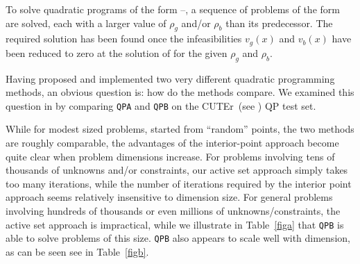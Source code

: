 \documentclass[twoside]{article}
\newcommand{\cuter}{{\sf CUTEr}}
\begin{document}
To solve quadratic programs of the form --, 
a sequence of problems of the form  are
solved, each with a larger value of $\rho_g$ and/or $\rho_b$ 
than its predecessor. The
required solution has been found once the infeasibilities 
$v_g(x)$ and $v_b(x)$ have been reduced to zero at the solution of 
 for the given $\rho_g$ and $\rho_b$.

Having proposed and implemented two very different quadratic programming
methods, an obvious question is: how do the methods compare. We examined
this question in  by comparing {\tt QPA} and {\tt QPB}
on the \cuter\ (see ) QP test set.

While for modest sized problems, started from ``random'' points, the two
methods are roughly comparable, the advantages of the interior-point approach
become quite clear when problem dimensions increase. For problems involving
tens of thousands of unknowns and/or constraints, our active set approach
simply takes too many iterations, while the number of iterations 
required by the interior point approach seems relatively insensitive to 
dimension size. For general problems involving hundreds of thousands or
even millions of unknowns/constraints, the active set approach is impractical,
while we illustrate in Table~\ref{figa} that
{\tt QPB} is able to solve problems of this size.
{\tt QPB} also appears to scale well with dimension, as can be seen 
see in Table~\ref{figb}.
\end{document}
